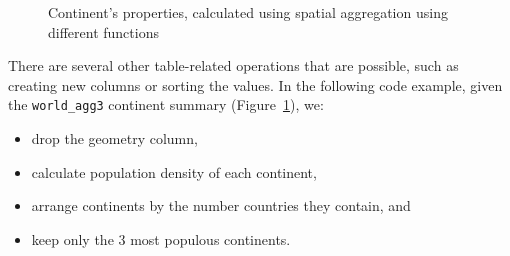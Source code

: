 \documentclass[
  letterpaper,
]{krantz}
\providecommand{\tightlist}{%
  \setlength{\itemsep}{0pt}\setlength{\parskip}{0pt}}\usepackage{longtable,booktabs,array}
\begin{document}
\begin{figure}

\begin{minipage}{0.33\linewidth}



\end{minipage}%
%
\begin{minipage}{0.33\linewidth}



\end{minipage}%
%
\begin{minipage}{0.33\linewidth}



\end{minipage}%

\caption{\label{fig-spatial-aggregation-different-functions}Continent's
properties, calculated using spatial aggregation using different
functions}

\end{figure}%

There are several other table-related operations that are possible, such
as creating new columns or sorting the values. In the following code
example, given the \texttt{world\_agg3} continent summary
(Figure~\ref{fig-spatial-aggregation-different-functions}), we:

\begin{itemize}
\tightlist
\item
  drop the geometry column,
\item
  calculate population density of each continent,
\item
  arrange continents by the number countries they contain, and
\item
  keep only the 3 most populous continents.
\end{itemize}
\end{document}
